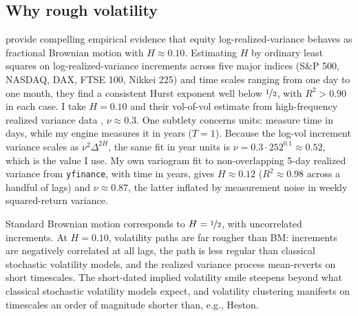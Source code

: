 \subsection{Why rough volatility}

\citet{gatheral2018volatility} provide compelling empirical evidence that equity
log-realized-variance behaves as fractional Brownian motion with $H \approx 0.10$.
Estimating $H$ by ordinary least squares on log-realized-variance increments across
five major indices (S\&P 500, NASDAQ, DAX, FTSE 100, Nikkei 225) and time scales
ranging from one day to one month, they find a consistent Hurst exponent well below
$\nicefrac{1}{2}$, with $R^2 > 0.90$ in each case.  I take $H = 0.10$ and their
vol-of-vol estimate from high-frequency realized variance data \citep{oxfordman},
$\nu \approx 0.3$.  One subtlety concerns units: \citet{gatheral2018volatility}
measure time in days, while my engine measures it in years ($T = 1$).  Because the
log-vol increment variance scales as $\nu^2\Delta^{2H}$, the same fit in year units is
$\nu = 0.3 \cdot 252^{0.1} \approx 0.52$, which is the value I use.  My own variogram fit to
non-overlapping 5-day realized variance from \texttt{yfinance}, with time in years,
gives $H \approx 0.12$ ($R^2 \approx 0.98$ across a handful of lags) and
$\nu \approx 0.87$, the latter inflated by measurement noise in weekly
squared-return variance.

Standard Brownian motion corresponds to $H = \nicefrac{1}{2}$, with uncorrelated increments. 
At $H = 0.10$, volatility paths are far rougher than BM: increments
are negatively correlated at all lags, the path is less regular than classical
stochastic volatility models, and the realized variance process mean-reverts on
short timescales. The short-dated implied volatility smile
steepens beyond what classical stochastic volatility models expect, and
volatility clustering manifests on timescales an order of magnitude shorter than, e.g., Heston.

